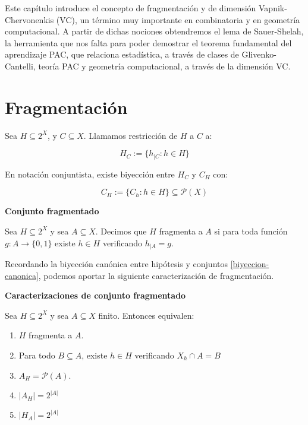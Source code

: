 Este capítulo introduce el concepto de fragmentación y de dimensión Vapnik-Chervonenkis (VC), un término muy importante en 
combinatoria y en geometría computacional. A partir de dichas nociones obtendremos el lema de Sauer-Shelah, la herramienta 
que nos falta para poder demostrar el teorema fundamental del aprendizaje PAC, que relaciona estadística, a través de 
clases de Glivenko-Cantelli, teoría PAC y geometría computacional, a través de la dimensión VC.

\section{Fragmentación}

\begin{definition}
Sea $H\subseteq 2^X$, y $C \subseteq X$. Llamamos restricción de $H$ a $C$ a:

\[H_{C} := \{h_{|C} : h\in H\}\]

En notación conjuntista, existe biyección entre $H_C$ y $C_{H}$ con:

\[C_{H} := \{C_h : h\in H\} \subseteq \mathcal{P}(X)\]
\end{definition}


\begin{definition} \textbf{Conjunto fragmentado}

 Sea $H\subseteq 2^X$ y sea $A\subseteq X$. Decimos que $H$ fragmenta a $A$ si para toda función $g:A\rightarrow \{0,1\}$ 
 existe $h\in H$ verificando $h_{|A} = g$.
\end{definition}

Recordando la biyección canónica entre hipótesis y conjuntos \ref{biyeccion-canonica}, podemos aportar la siguiente 
caracterización de fragmentación.

\begin{fact} \textbf{Caracterizaciones de conjunto fragmentado}

 Sea $H\subseteq 2^X$ y sea $A\subseteq X$ finito. Entonces equivalen:
 
 \begin{enumerate}[i]
  \item $H$ fragmenta a $A$.
  \item Para todo $B\subseteq A$, existe $h\in H$ verificando $X_h \cap A = B$
  \item $A_H = \mathcal{P}(A)$.
  \item $|A_H| = 2^{|A|}$
  \item $|H_A| = 2^{|A|}$
 \end{enumerate}
\end{fact}

